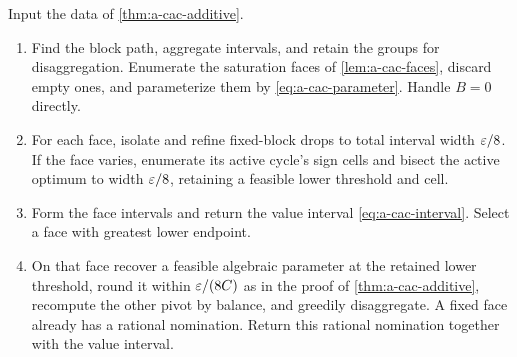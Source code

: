 \begin{algorithm}
\label{alg:a-cac-additive}
Input the data of \cref{thm:a-cac-additive}.
\begin{enumerate}
\item Find the block path, aggregate intervals, and retain the groups
for disaggregation. Enumerate the saturation faces of
\cref{lem:a-cac-faces}, discard empty ones, and parameterize them by
\cref{eq:a-cac-parameter}. Handle $B=0$ directly.
\item For each face, isolate and refine fixed-block drops to total
interval width $\varepsilon/8$. If the face varies, enumerate its active
cycle's sign cells and bisect the active optimum to width $\varepsilon/8$,
retaining a feasible lower threshold and cell.
\item Form the face intervals and return the value interval
\cref{eq:a-cac-interval}. Select a face with greatest lower endpoint.
\item On that face recover a feasible algebraic parameter at the
retained lower threshold, round it within $\varepsilon/(8C)$ as in the proof of
\cref{thm:a-cac-additive}, recompute the other pivot by balance, and
greedily disaggregate. A fixed face already has a rational nomination.
Return this rational nomination together with the value interval.
\end{enumerate}
\end{algorithm}

